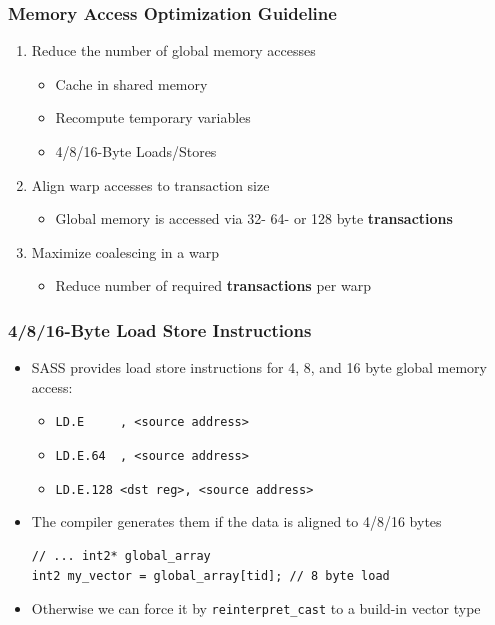 \documentclass[aspectratio=169,handout]{beamer}
\begin{document}
\begin{frame}[fragile]
\frametitle{Memory Access Optimization Guideline}


\begin{enumerate}
	\item Reduce the number of global memory accesses
	\begin{itemize}
	\item Cache in shared memory
	\item Recompute temporary variables
	\item 4/8/16-Byte Loads/Stores
	\end{itemize}
	\item Align warp accesses to transaction size
\begin{itemize}
	\item Global memory is accessed via 32- 64- or 128 byte \textbf{transactions}
	\end{itemize}
	\item Maximize coalescing in a warp
\begin{itemize}
	\item Reduce number of required \textbf{transactions} per warp
	\end{itemize}	
\end{enumerate}
\end{frame}

\begin{frame}[fragile]
\frametitle{4/8/16-Byte Load Store Instructions}
\begin{itemize}
\item SASS provides load store instructions for 4, 8, and 16 byte global memory access:
\begin{itemize}
	\item \texttt{LD.E \ \ \ \ <dst reg>, <source address>}
	\item \texttt{LD.E.64 \ <dst reg>, <source address>}
	\item \texttt{LD.E.128 <dst reg>, <source address>}
\end{itemize}
\item The compiler generates them if the data is aligned to 4/8/16 bytes
\begin{lstlisting}
// ... int2* global_array 
int2 my_vector = global_array[tid]; // 8 byte load
\end{lstlisting}
\item Otherwise we can force it by \texttt{reinterpret\_cast} to a build-in vector type
\end{itemize}
\end{frame}
\end{document}
